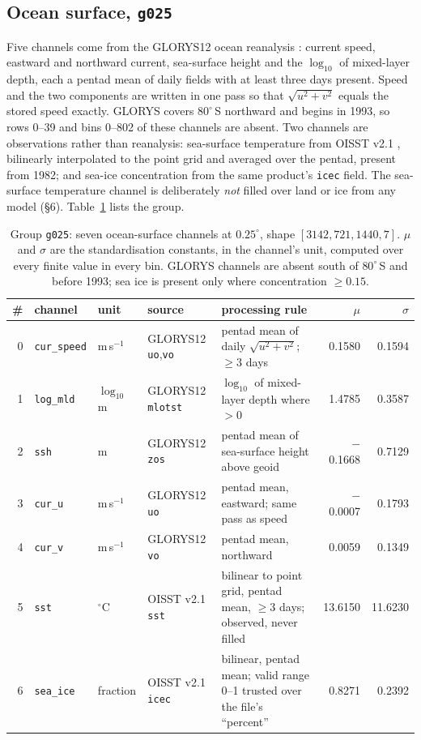 \documentclass[10pt]{article}
\newcommand{\code}[1]{\texttt{#1}}
\begin{document}
\subsection{Ocean surface, \code{g025}}

Five channels come from the GLORYS12 ocean reanalysis \cite{glorys}: current
speed, eastward and northward current, sea-surface height and the
$\log_{10}$ of mixed-layer depth, each a pentad mean of daily fields with at
least three days present. Speed and the two components are written in one
pass so that $\sqrt{u^2+v^2}$ equals the stored speed exactly. GLORYS covers
$80^\circ$\,S northward and begins in 1993, so rows 0--39 and bins 0--802 of
these channels are absent. Two channels are observations rather than
reanalysis: sea-surface temperature from OISST v2.1 \cite{oisst}, bilinearly
interpolated to the point grid and averaged over the pentad, present from
1982; and sea-ice concentration from the same product's \code{icec} field.
The sea-surface temperature channel is deliberately \emph{not} filled over
land or ice from any model (\S6). Table~\ref{tab:g025} lists the group.

\begin{table}[h]
\centering\setlength{\tabcolsep}{4pt}\footnotesize
\begin{tabular}{@{}rl>{\raggedright\arraybackslash}p{1.6cm}>{\raggedright\arraybackslash}p{2.6cm}>{\raggedright\arraybackslash}p{5.0cm}rr@{}}
\toprule
\# & channel & unit & source & processing rule & $\mu$ & $\sigma$ \\
\midrule
0 & \code{cur\_speed} & m\,s$^{-1}$ & GLORYS12 \code{uo},\code{vo} & pentad mean of daily $\sqrt{u^2+v^2}$; $\geq3$ days & 0.1580 & 0.1594 \\
1 & \code{log\_mld} & $\log_{10}$\,m & GLORYS12 \code{mlotst} & $\log_{10}$ of mixed-layer depth where $>0$ & 1.4785 & 0.3587 \\
2 & \code{ssh} & m & GLORYS12 \code{zos} & pentad mean of sea-surface height above geoid & $-$0.1668 & 0.7129 \\
3 & \code{cur\_u} & m\,s$^{-1}$ & GLORYS12 \code{uo} & pentad mean, eastward; same pass as speed & $-$0.0007 & 0.1793 \\
4 & \code{cur\_v} & m\,s$^{-1}$ & GLORYS12 \code{vo} & pentad mean, northward & 0.0059 & 0.1349 \\
5 & \code{sst} & $^\circ$C & OISST v2.1 \code{sst} & bilinear to point grid, pentad mean, $\geq3$ days; observed, never filled & 13.6150 & 11.6230 \\
6 & \code{sea\_ice} & fraction & OISST v2.1 \code{icec} & bilinear, pentad mean; valid range 0--1 trusted over the file's ``percent'' & 0.8271 & 0.2392 \\
\bottomrule
\end{tabular}
\caption{Group \code{g025}: seven ocean-surface channels at $0.25^\circ$, shape $[3142,721,1440,7]$. $\mu$ and $\sigma$ are the standardisation constants, in the channel's unit, computed over every finite value in every bin. GLORYS channels are absent south of $80^\circ$\,S and before 1993; sea ice is present only where concentration $\geq0.15$.}
\label{tab:g025}
\end{table}
\end{document}
